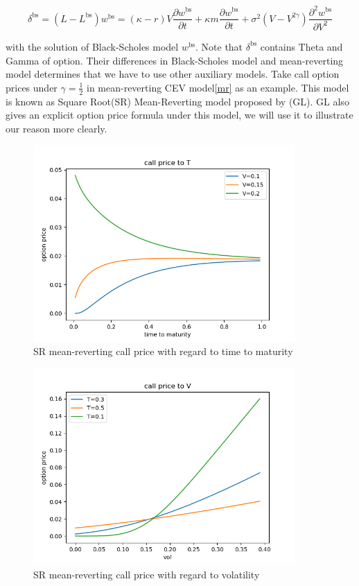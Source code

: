 $$\delta^{\text{bs}} = (L - L^{\text{bs}}) w^{\text{bs}} = (\kappa - r)V \frac{\partial w^{\text{bs}}}{\partial t} + \kappa m \frac{\partial w^{\text{bs}}}{\partial t} + \sigma^{2} (V - V^{2 \gamma}) \frac{\partial^{2} w^{\text{bs}}}{\partial V^{2}} $$

\noindent with the solution of Black-Scholes model $w^{\text{bs}}$. Note that $\delta^{\text{bs}}$ contains Theta and Gamma of option. Their differences in Black-Scholes model and mean-reverting model determines that we have to use other auxiliary models. Take call option prices under $\gamma=\frac{1}{2}$ in mean-reverting CEV model\eqref{mr} as an example. This model is known as Square Root(SR) Mean-Reverting model proposed by \cite{grunbichler_valuing_1996}(GL). GL also gives an explicit option price formula under this model, we will use it to illustrate our reason more clearly.


\begin{figure}[ht]
    \centering
    \includegraphics[width=10cm]{./figures/call2T.png}
    \caption{SR mean-reverting call price with regard to time to maturity}\label{call2t}
\end{figure}

\begin{figure}[ht]
    \centering
    \includegraphics[width=10cm]{./figures/call2V.png}
    \caption{SR mean-reverting call price with regard to volatility}\label{call2v}
\end{figure}

